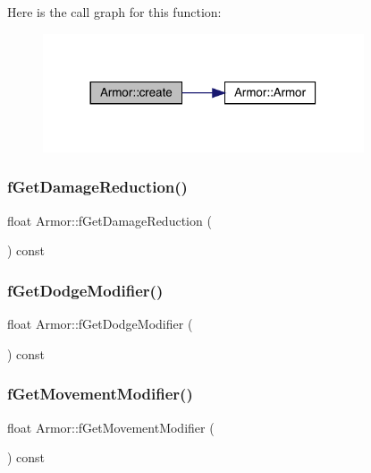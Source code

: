 Here is the call graph for this function\+:
\nopagebreak
\begin{figure}[H]
\begin{center}
\leavevmode
\includegraphics[width=269pt]{class_armor_a21de0acaa6ecdb6f5937166b83da9b01_cgraph}
\end{center}
\end{figure}
\mbox{\label{class_armor_a2ac47305b38298494fae82c69c935fba}} 
\subsubsection{\texorpdfstring{f\+Get\+Damage\+Reduction()}{fGetDamageReduction()}}
{\footnotesize\ttfamily float Armor\+::f\+Get\+Damage\+Reduction (\begin{DoxyParamCaption}{ }\end{DoxyParamCaption}) const}

\mbox{\label{class_armor_a2eab88550e74345eef13e2a279a2f995}} 
\subsubsection{\texorpdfstring{f\+Get\+Dodge\+Modifier()}{fGetDodgeModifier()}}
{\footnotesize\ttfamily float Armor\+::f\+Get\+Dodge\+Modifier (\begin{DoxyParamCaption}{ }\end{DoxyParamCaption}) const}

\mbox{\label{class_armor_a788fee5745a82a7ffc587aa4938200dc}} 
\subsubsection{\texorpdfstring{f\+Get\+Movement\+Modifier()}{fGetMovementModifier()}}
{\footnotesize\ttfamily float Armor\+::f\+Get\+Movement\+Modifier (\begin{DoxyParamCaption}{ }\end{DoxyParamCaption}) const}

